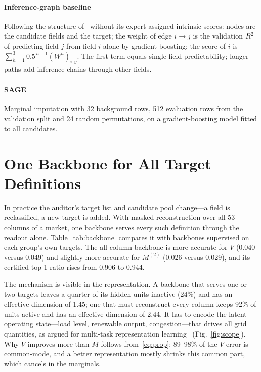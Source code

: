 \paragraph{Inference-graph baseline} Following the structure of~\cite{hu2026ignn} without its
expert-assigned intrinsic scores: nodes are the candidate fields and the target; the weight of edge
$i\to j$ is the validation $R^2$ of predicting field $j$ from field $i$ alone by gradient boosting; the
score of $i$ is $\sum_{h=1}^{3}0.5^{\,h-1}(W^{h})_{i,y}$. The first term equals single-field
predictability; longer paths add inference chains through other fields.

\paragraph{SAGE} Marginal imputation with 32 background rows, 512 evaluation rows from the
validation split and 24 random permutations, on a gradient-boosting model fitted to all candidates.



\FloatBarrier
\section{One Backbone for All Target Definitions}\label{app:scope}
In practice the auditor's target list and candidate pool change---a field is reclassified, a new
target is added. With masked reconstruction over all 53 columns of a market, one backbone serves
every such definition through the readout alone. Table~\ref{tab:backbone} compares it with
backbones supervised on each group's own targets. The all-column backbone is more accurate for
$V$ (0.040 versus 0.049) and slightly more accurate for $M^{(2)}$ (0.026 versus 0.029), and its
certified top-1 ratio rises from 0.906 to 0.944.

The mechanism is visible in the representation. A backbone that serves one or two targets leaves a
quarter of its hidden units inactive (24\%) and has an effective dimension of 1.45; one that must
reconstruct every column keeps 92\% of units active and has an effective dimension of 2.44. It has
to encode the latent operating state---load level, renewable output, congestion---that drives all
grid quantities, as argued for multi-task representation
learning~\cite{caruana1997multitask,baxter2000inductive,maurer2016benefit} (Fig.~\ref{fig:scope}). Why $V$ improves more
than $M$ follows from~\eqref{eq:prop}: 89--98\% of the $V$ error is common-mode, and a better
representation mostly shrinks this common part, which cancels in the marginals.

